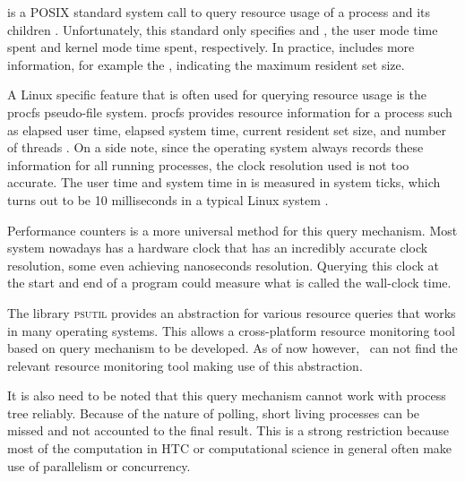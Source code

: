  is a POSIX standard system call to query resource usage of a process and its children \citep{manpages}.
Unfortunately, this standard only specifies  and , the user mode time spent and kernel mode time spent, respectively.
In practice,  includes more information, for example the , indicating the maximum resident set size.

A Linux specific feature that is often used for querying resource usage is the procfs pseudo-file system.
procfs provides resource information for a process such as elapsed user time, elapsed system time, current resident set size, and number of threads \citep{manpages}.
On a side note, since the operating system always records these information for all running processes, the clock resolution used is not too accurate.
The user time and system time in  is measured in system ticks, which turns out to be 10 milliseconds in a typical Linux system \citep{manpages}.



Performance counters is a more universal method for this query mechanism.
Most system nowadays has a hardware clock that has an incredibly accurate clock resolution, some even achieving nanoseconds resolution.
Querying this clock at the start and end of a program could measure what is called the wall-clock time.

The library \textsc{psutil} \citep{rodolaCrossplatformLibProcess2019} provides an abstraction for various resource queries that works in many operating systems.
This allows a cross-platform resource monitoring tool based on query mechanism to be developed.
As of now however, \first~can not find the relevant resource monitoring tool making use of this abstraction.

It is also need to be noted that this query mechanism cannot work with process tree reliably.
Because of the nature of polling, short living processes can be missed and not accounted to the final result.
This is a strong restriction because most of the computation in HTC or computational science in general often make use of parallelism or concurrency.


